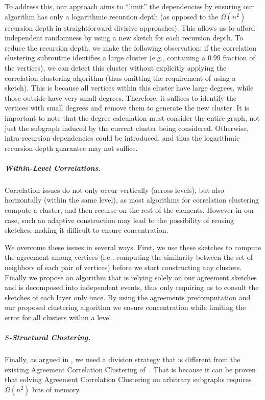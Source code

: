 \documentclass{article}
\begin{document}
To address this, our approach aims to ``limit'' the dependencies by ensuring our algorithm has only a logarithmic recursion depth (as opposed to the \(\Omega(n^2)\) recursion depth in straightforward divisive approaches). This allows us to afford independent randomness by using a new sketch for each recursion depth.
To reduce the recursion depth, we make the following observation: if the correlation clustering subroutine identifies a large cluster (e.g., containing a $0.99$ fraction of the vertices), we can detect this cluster without explicitly applying the correlation clustering algorithm (thus omitting the requirement of using a sketch). This is because all vertices within this cluster have large degrees, while those outside have very small degrees. Therefore, it suffices to identify the vertices with small degrees and remove them to generate the new cluster.
It is important to note that the degree calculation must consider the entire graph, not just the subgraph induced by the current cluster being considered. Otherwise, intra-recursion dependencies could be introduced, and thus the logarithmic recursion depth guarantee may not suffice.


\subparagraph*{Within-Level Correlations.} Correlation issues do not only occur vertically (across levels), but also horizontally (within the same level), as most algorithms for correlation clustering compute a cluster, and then recurse on the rest of the elements.
However in our case, such an adaptive construction may lead to the possibility of reusing sketches, making it difficult to ensure concentration.

We overcome these issues in several ways. 
First, we use these sketches to compute the agreement among vertices (i.e., computing the similarity between the set of neighbors of each pair of vertices) before we start constructing any clusters.
Finally we propose an algorithm that is relying solely on our agreement sketches and is decomposed into independent events, thus only requiring us to consult the sketches of each layer only once. By using the agreements precomputation and our proposed clustering algorithm we ensure concentration while limiting the error for all clusters within a level.


\subparagraph*{$S$-Structural Clustering.} Finally, as argued in , we need a division strategy that is different from the existing Agreement Correlation Clustering of~\cite{cohen2022fitting}.
That is because it can be proven that solving Agreement Correlation Clustering on arbitrary subgraphs requires $\Omega(n^2)$ bits of memory.
\end{document}
